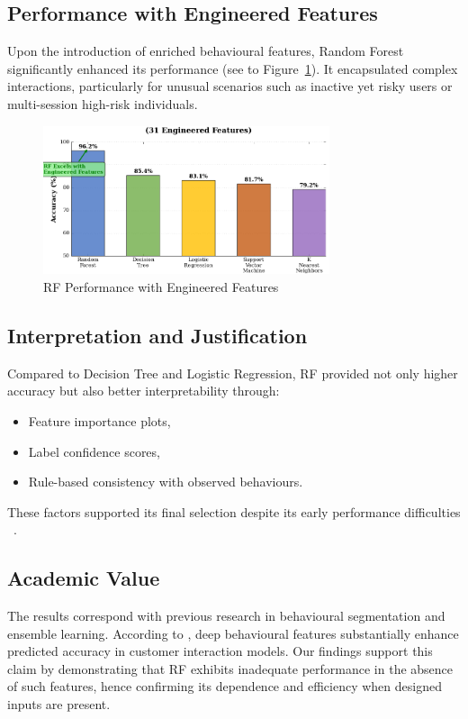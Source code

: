 \documentclass[12pt,a4paper]{report}
\begin{document}
\subsection{Performance with Engineered Features}
Upon the introduction of enriched behavioural features, Random Forest significantly enhanced its performance (see to Figure~\ref{fig:rf_engineered}). It encapsulated complex interactions, particularly for unusual scenarios such as inactive yet risky users or multi-session high-risk individuals.

\begin{figure}[H]
    \centering
    \includegraphics[width=0.75\textwidth]{figures/rf_excels_engineered_features.png}
    \caption{RF Performance with Engineered Features}
    \label{fig:rf_engineered}
\end{figure}

\subsection{Interpretation and Justification}
Compared to Decision Tree and Logistic Regression, RF provided not only higher accuracy but also better interpretability through:
\begin{itemize}
    \item Feature importance plots,
    \item Label confidence scores,
    \item Rule-based consistency with observed behaviours.
\end{itemize}
These factors supported its final selection despite its early performance difficulties ~\citep{rf_original}.

\subsection{Academic Value}
The results correspond with previous research in behavioural segmentation and ensemble learning.  According to \citet{ghaharian2022b}, deep behavioural features substantially enhance predicted accuracy in customer interaction models.  Our findings support this claim by demonstrating that RF exhibits inadequate performance in the absence of such features, hence confirming its dependence and efficiency when designed inputs are present.
\end{document}
